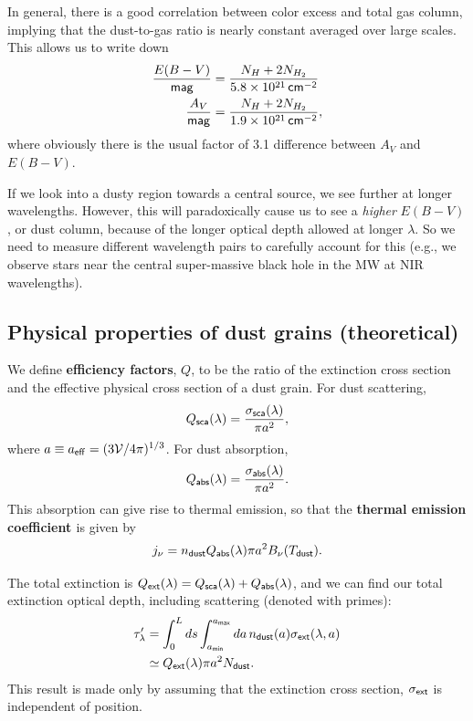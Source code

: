 \documentclass{tufte-handout}
\renewcommand{\textbf}[1]{{\bf \textcolor{dark-gray}{#1}}}
\renewcommand{\rm}{\sf}
\newcommand{\e}[1]{\times 10^{#1}}
\begin{document}
In general, there is a good correlation between color excess and total gas column, implying that the dust-to-gas ratio is nearly constant averaged over large scales. This allows us to write down 
\begin{align*}
\frac{E(B-V)}{\rm mag} &= \frac{N_H + 2N_{H_2}}{5.8\e{21} {\rm\, cm^{-2}}}\\
\frac{A_V}{\rm mag} &= \frac{N_H + 2N_{H_2}}{1.9\e{21} {\rm\, cm^{-2}}},
\end{align*}
where obviously there is the usual factor of 3.1 difference between $A_V$ and $E(B-V)$.

If we look into a dusty region towards a central source, we see further at longer wavelengths. However, this will paradoxically cause us to see a \textit{higher} $E(B-V)$, or dust column, because of the longer optical depth allowed at longer $\lambda$. So we need to measure different wavelength pairs to carefully account for this (e.g., we observe stars near the central super-massive black hole in the MW at NIR wavelengths).


\subsection{Physical properties of dust grains (theoretical)}
We define \textbf{efficiency factors}, $Q$, to be the ratio of the extinction cross section and the effective physical cross section of a dust grain. For dust scattering,
\[Q_{\rm sca}(\lambda) = \frac{\sigma_{\rm sca}(\lambda)}{\pi a^2},\]
where $a \equiv a_{\rm eff} = (3\mathcal V/4\pi)^{1/3}$. For dust absorption,
\[Q_{\rm abs}(\lambda) = \frac{\sigma_{\rm abs}(\lambda)}{\pi a^2}.  \]
This absorption can give rise to thermal emission, so that the \textbf{thermal emission coefficient }is given by
\begin{equation}
j_\nu = n_{\rm dust} Q_{\rm abs}(\lambda) \pi a^2 B_\nu(T_{\rm dust}).
\end{equation}

The total extinction is $Q_{\rm ext}(\lambda) = Q_{\rm sca}(\lambda) + Q_{\rm abs}(\lambda)$, and we can find our total extinction optical depth, including scattering (denoted with primes):
\begin{align}
\tau_\lambda' &= \int_0^L ds \int_{a_{\rm min}}^{a_{\rm max}} da \, n_{\rm dust}(a) \sigma_{\rm ext}(\lambda, a)\\
&\simeq Q_{\rm ext}(\lambda) \pi a^2 N_{\rm dust}.
\end{align}
This result is made only by assuming that the extinction cross section, $\sigma_{\rm ext}$ is independent of position.
\end{document}
